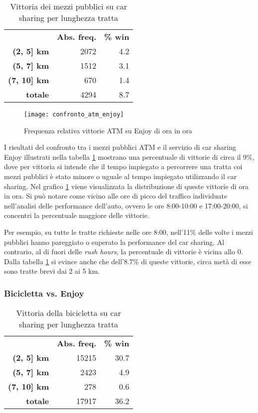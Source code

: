 \begin{table}[H]
	\centering

	\begin{tabular}{ | r r r | }
		\hline
		& \textbf{Abs. freq.} & \textbf{\% win} \\
		\textbf{(2, 5] km} & 2072 & 4.2 \\
		\textbf{(5, 7] km} & 1512 & 3.1 \\
		\textbf{(7, 10] km} & 670 & 1.4 \\
		\hline
		\textbf{totale} & 4294 & 8.7 \\
		\hline
	\end{tabular}

	\caption{Vittoria dei mezzi pubblici su car sharing per lunghezza tratta}
	\label{table:5}
\end{table}

\begin{figure}[H]
	\texttt{[image: confronto\_atm\_enjoy]}
	\caption{Frequenza relativa vittorie ATM su Enjoy di ora in ora}
	\label{image:10}
\end{figure}

I risultati del confronto tra i mezzi pubblici ATM e il servizio di car sharing Enjoy illustrati nella tabella \ref{table:5} mostrano una percentuale di vittorie di circa il 9\%, dove per vittoria si intende che il tempo impiegato a percorrere una tratta coi mezzi pubblici è stato minore o uguale al tempo impiegato utilizzando il car sharing. Nel grafico \ref{image:10} viene visualizzata la distribuzione di queste vittorie di ora in ora. Si può notare come vicino alle ore di picco del traffico individuate nell'analisi delle performance dell'auto, ovvero le ore 8:00-10:00 e 17:00-20:00, si concentri la percentuale maggiore delle vittorie.

Per esempio, su tutte le tratte richieste nelle ore 8:00, nell'11\% delle volte i mezzi pubblici hanno pareggiato o superato la performance del car sharing. Al contrario, al di fuori delle \textit{rush hours}, la percentuale di vittorie è vicina allo 0. Dalla tabella \ref{table:5} si evince anche che dell'8.7\% di queste vittorie, circa metà di esse sono tratte brevi dai 2 ai 5 km.

\subsubsection{Bicicletta vs. Enjoy}

\begin{table}[H]
	\centering
	
	\begin{tabular}{ | r r r | }
		\hline
		& \textbf{Abs. freq.} & \textbf{\% win} \\
		\textbf{(2, 5] km} & 15215 & 30.7 \\
		\textbf{(5, 7] km} & 2423 & 4.9 \\
		\textbf{(7, 10] km} & 278 & 0.6 \\
		\hline
		\textbf{totale} & 17917 & 36.2 \\
		\hline
	\end{tabular}
	
	\caption{Vittoria della bicicletta su car sharing per lunghezza tratta}
	\label{table:6}
\end{table}


